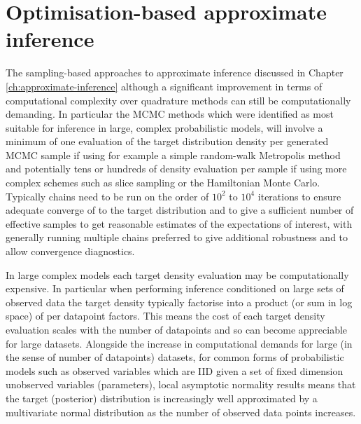 \chapter{Optimisation-based approximate inference}\label{app:optimisation-based-approximate-inference}

The sampling-based approaches to approximate inference discussed in Chapter \ref{ch:approximate-inference} although a significant improvement in terms of computational complexity over quadrature methods can still be computationally demanding. In particular the \ac{MCMC} methods which were identified as most suitable for inference in large, complex probabilistic models, will involve a minimum of one evaluation of the target distribution density per generated \ac{MCMC} sample if using for example a simple random-walk Metropolis method and potentially tens or hundreds of density evaluation per sample if using more complex schemes such as slice sampling or the Hamiltonian Monte Carlo. Typically chains need to be run on the order of $10^2$ to $10^4$ iterations to ensure adequate converge of to the target distribution and to give a sufficient number of effective samples to get reasonable estimates of the expectations of interest, with generally running multiple chains preferred to give additional robustness and to allow convergence diagnostics.

In large complex models each target density evaluation may be computationally expensive. In particular when performing inference conditioned on large sets of observed data the target density typically factorise into a product (or sum in log space) of per datapoint factors. This means the cost of each target density evaluation scales with the number of datapoints and so can become appreciable for large datasets. Alongside the increase in computational demands for large (in the sense of number of datapoints) datasets, for common forms of probabilistic models such as observed variables which are \ac{IID} given a set of fixed dimension unobserved variables (parameters), local asymptotic normality results means that the target (posterior) distribution is increasingly well approximated by a multivariate normal distribution as the number of  observed data points increases. %

